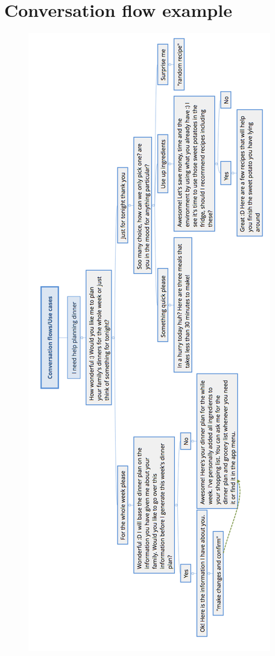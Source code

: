 \section{Conversation flow example}
    \label{converflow}
     \begin{figure}
        \centering
        \includegraphics[scale=0.4]{figures/convflow.png}
    \end{figure}
    
